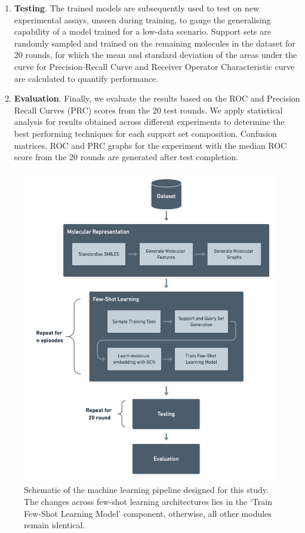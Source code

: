 \begin{enumerate}
	\item \textbf{Testing}. The trained models are subsequently used to test on new experimental assays, unseen during training, to gauge the generalising capability of a model trained for a low-data scenario. Support sets are randomly sampled and trained on the remaining molecules in the dataset for 20 rounds, for which the mean and standard deviation of the areas under the curve for Precision-Recall Curve and Receiver Operator Characteristic curve are calculated to quantify performance.

	\item \textbf{Evaluation}. Finally, we evaluate the results based on the ROC and Precision Recall Curves (PRC) scores from the 20 test rounds. We apply statistical analysis for results obtained across different experiments to determine the best performing techniques for each support set composition. Confusion matrices, ROC and PRC graphs for the experiment with the median ROC score from the 20 rounds are generated after test completion.
\end{enumerate}

\begin{figure}[!ht]
	\centering
	\includegraphics[width=0.9\linewidth]{img/architecture-schematic.png}
	\caption[Schematic of the major parts in our architecture]{Schematic of the machine learning pipeline designed for this study. The changes across few-shot learning architectures lies in the `Train Few-Shot Learning Model' component, otherwise, all other modules remain identical.}
	\label{fig:architecture-schematic}
\end{figure}

